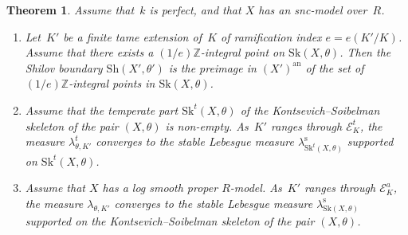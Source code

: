 \documentclass[JEP,XML,SOM,Unicode,NoFloatCountersInSection]{cedram}
\let\mathcal\mathscr
\newtheorem{theorem}[equation]{Theorem}
\theoremstyle{definition}
\numberwithin{equation}{subsection}
\newcommand{\Z}{\ensuremath{\mathbb{Z}}}
\newcommand{\snc}{\textit{snc}}
\newcommand{\an}{\mathrm{an}}
\newcommand{\Sh}{\mathrm{Sh}}
\newcommand{\Sk}{\mathrm{Sk}}
\newcommand{\rs}{\mathrm{s}}
\let\form\theta
\let\Leb\lambda
\begin{document}
\begin{theorem}\label{thm:main}
Assume that~$k$ is perfect, and that $X$ has an \snc-model over~$R$.
\begin{enumerate}
\item \label{it:maina} Let~$K'$ be a finite tame extension of~$K$ of ramification index $e=e(K'/K)$.
Assume that there exists a $(1/e)\Z$-integral point on $\Sk(X,\form)$.
Then the Shilov boundary $\Sh(X',\form')$ is the preimage in $(X')^{\an}$ of the set of $(1/e)\Z$-integral points in $\Sk(X,\form)$.

\item \label{it:tame}
Assume that the temperate part $\Sk^t(X,\form)$ of the Kontsevich--Soibelman skeleton of the pair $(X,\form)$ is non-empty.
As~$K'$ ranges through $\mathcal{E}^t_K$, the measure $\lambda^t_{\form,K'}$ converges to the stable Lebesgue measure $\Leb^{\rs}_{\Sk^t(X,\form)}$
supported on $\Sk^t(X,\form)$.

\item \label{it:wild} Assume that $X$ has a log smooth proper $R$\nobreakdash-model.
As~$K'$ ranges through $\mathcal{E}^a_K$, the measure $\lambda_{\form,K'}$ converges to the stable Lebesgue measure $\Leb^{\rs}_{\Sk(X,\form)}$
supported on the Kontsevich--Soibelman skeleton of the pair $(X,\form)$.
\end{enumerate}
\end{theorem}
\end{document}
